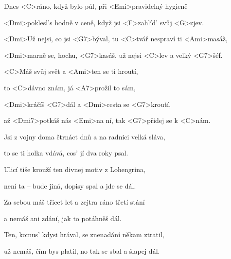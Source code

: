 

\zs
Dnes <C>ráno, když bylo půl, při <Emi>pravidelný hygieně

<Dmi>poklesl's hodně v ceně, když jsi <F>zahlíd' svůj <G>zjev.

<Dmi>Už nejsi, co jsi <G7>býval, tu <C>tvář nespraví ti <Ami>masáž,

<Dmi>marně se, hochu, <G7>kasáš, už nejsi <C>lev a velký <G7>šéf.
\ks

\zr
<C>Máš svůj svět a <Ami>ten se ti hroutí,

to <C>dávno znám, já <A7>prožil to sám,

<Dmi>kráčíš <G7>dál a <Dmi>cesta se <G7>kroutí,

až <Dmi7>potkáš nás <Emi>na ní, tak <G7>přidej se k <C>nám.
\kr

\zs
Jsi z vojny doma čtrnáct dnů a na radnici velká sláva,

to se ti holka vdává, cos' jí dva roky psal.

Ulicí tiše krouží ten divnej motiv z Lohengrina,

není ta -- bude jiná, dopisy spal a jde se dál.
\ks

\zr\kr

\zs
Za sebou máš třicet let a zejtra ráno třetí stání

a nemáš ani zdání, jak to potáhněš dál.

Ten, komus' kdysi hrával, se znenadání někam ztratil,

už nemáš, čím bys platil, no tak se sbal a šlapej dál.
\ks

\zr\kr

\kp
